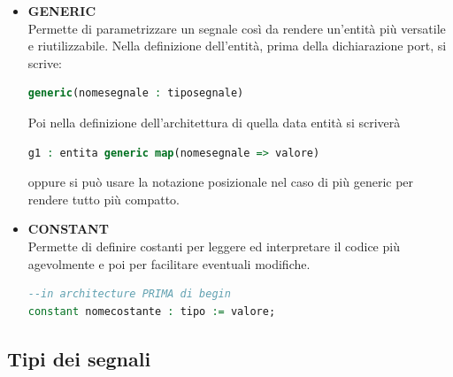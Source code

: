 \documentclass[a4paper]{book}
\begin{document}
\begin{itemize}
\item\textbf{GENERIC}\\
Permette di parametrizzare un segnale così da rendere un'entità più versatile e riutilizzabile.
Nella definizione dell'entità, prima della dichiarazione port, si scrive:
\begin{lstlisting}[language=VHDL]
generic(nomesegnale : tiposegnale)
\end{lstlisting}
Poi nella definizione dell'architettura di quella data entità si scriverà 
\begin{lstlisting}[language=VHDL]
g1 : entita generic map(nomesegnale => valore)
\end{lstlisting}
oppure si può usare la notazione posizionale nel caso di più generic per rendere tutto più compatto.

\item\textbf{CONSTANT}\\
Permette di definire costanti per leggere ed interpretare il codice più agevolmente e poi per facilitare eventuali modifiche.

\begin{lstlisting}[language=VHDL]
--in architecture PRIMA di begin
constant nomecostante : tipo := valore;
\end{lstlisting}
\end{itemize}


\subsection{Tipi dei segnali}
\end{document}

